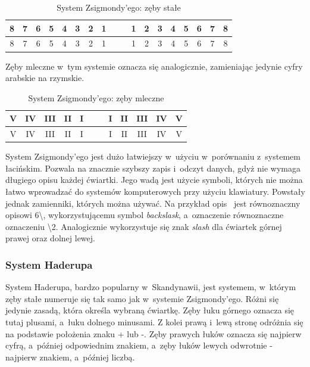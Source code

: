 \begin{table}[h t]
\centering
\begin{tabular}{c c c c c c c c c | c c c c c c c c c}
8 & 7 & 6 & 5 & 4 & 3 & 2 & 1 &&& 1 & 2 & 3 & 4 & 5 & 6 & 7 & 8
\\ [1ex] \hline \rule{0pt}{1.2\normalbaselineskip}
8 & 7 & 6 & 5 & 4 & 3 & 2 & 1 &&& 1 & 2 & 3 & 4 & 5 & 6 & 7 & 8
\end{tabular}
\caption{\label{tab:tab3} System Zsigmondy’ego: zęby stałe}
\end{table}

Zęby mleczne w~tym systemie oznacza się analogicznie, zamieniając jedynie cyfry arabskie na rzymskie.

\begin{table}[h t]
\centering
\begin{tabular}{c c c c c c | c c c c c c}
V & IV & III & II & I &&& I & II & III & IV & V
\\ [1ex] \hline \rule{0pt}{1.2\normalbaselineskip}
V & IV & III & II & I &&& I & II & III & IV & V
\end{tabular}
\caption{\label{tab:tab4} System Zsigmondy’ego: zęby mleczne}
\end{table}

System Zsigmondy'ego jest dużo łatwiejszy w~użyciu w~porównaniu z~systemem łacińskim. Pozwala na znacznie szybszy zapis i~odczyt danych, gdyż nie wymaga długiego opisu każdej ćwiartki. Jego wadą jest użycie symboli, których nie można łatwo wprowadzać do systemów komputerowych przy użyciu klawiatury. Powstały jednak zamienniki, których można używać. Na przykład opis ~jest równoznaczny opisowi 6\textbackslash{}, wykorzystującemu symbol \textit{backslask}, a~oznaczenie  równoznaczne oznaczeniu \textbackslash2. Analogicznie wykorzystuje się znak \textit{slash} dla ćwiartek górnej prawej oraz dolnej lewej.

\subsubsection{System Haderupa}

System Haderupa, bardzo popularny w~Skandynawii, jest systemem, w~którym zęby stałe numeruje się tak samo jak w~systemie Zsigmondy’ego. Różni się jedynie zasadą, która określa wybraną ćwiartkę. Zęby łuku górnego oznacza się tutaj plusami, a~łuku dolnego minusami. Z kolei prawą i~lewą stronę odróżnia się na podstawie położenia znaku + lub -. Zęby prawych łuków oznacza się najpierw cyfrą, a~później odpowiednim znakiem, a~zęby łuków lewych odwrotnie - najpierw znakiem, a~później liczbą.\\

